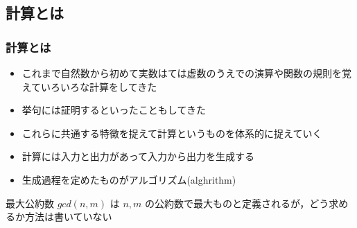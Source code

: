 \subsection{計算とは}
\begin{frame}
\frametitle{計算とは}
  \begin{itemize}
\item これまで自然数から初めて実数はては虚数のうえでの演算や関数の規則を覚えていろいろな計算をしてきた
\item 挙句には証明するといったこともしてきた
\item これらに共通する特徴を捉えて計算というものを体系的に捉えていく
\item 計算には入力と出力があって入力から出力を生成する
\item 生成過程を定めたものがアルゴリズム(alghrithm)
  \end{itemize}
  \begin{example}[最大公約数]
最大公約数 \(gcd(n,m)\) は \(n, m\) の公約数で最大ものと定義されるが，どう求めるか方法は書いていない
  \end{example}
\end{frame}
%
